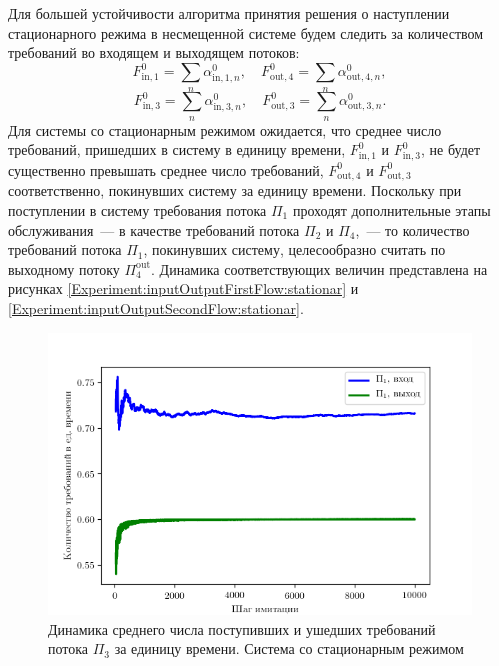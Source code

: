 Для большей устойчивости алгоритма принятия решения о наступлении стационарного режима в несмещенной системе будем следить за количеством требований во входящем и выходящем потоков:
\begin{equation}
    F^{0}_{\text{in},1} = \sum_n \alpha^{0}_{\text{in},1,n}, \quad 
    F^{0}_{\text{out},4} = \sum_n \alpha^{0}_{\text{out},4,n},
\end{equation}
\begin{equation}
    F^{0}_{\text{in},3} = \sum_n \alpha^{0}_{\text{in},3,n}, \quad 
    F^{0}_{\text{out},3} = \sum_n \alpha^{0}_{\text{out},3,n}.
\end{equation}
Для системы со стационарным режимом ожидается, что среднее число требований, пришедших в систему в единицу времени, $F^{0}_{\text{in},1}$ и $F^{0}_{\text{in},3}$, не будет существенно превышать среднее число требований, $ F^{0}_{\text{out},4}$ и $F^{0}_{\text{out},3}$ соответственно, покинувших систему за единицу времени. Поскольку при поступлении в систему требования потока $\Pi_1$ проходят дополнительные этапы обслуживания~--- в качестве требований потока $\Pi_2$ и $\Pi_4$,~--- то количество требований потока $\Pi_1$, покинувших систему, целесообразно считать по выходному потоку $\Pi_4^{\text{out}}$. Динамика соответствующих величин представлена на рисунках \ref{Experiment:inputOutputFirstFlow:stationar} и \ref{Experiment:inputOutputSecondFlow:stationar}.

\begin{figure}[t]
\centering
\includegraphics[scale=1]{Dissertation/Work_structured/Pictures/pic_inputOutputFirstFlow.png}
\caption{Динамика среднего числа поступивших и ушедших требований потока $\Pi_3$ за единицу времени. Система со стационарным режимом}
\label{Experiment:inputOutputFirstFlow}
\end{figure}




